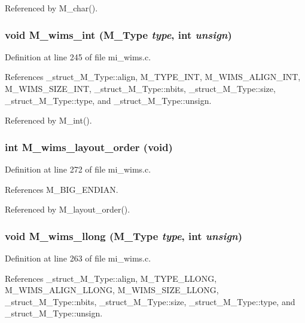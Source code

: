 Referenced by M\_\-char().
\subsubsection{\setlength{\rightskip}{0pt plus 5cm}void M\_\-wims\_\-int (\bf{M\_\-Type} {\em type}, int {\em unsign})}\label{mi__wims_8c_ee6a0cec79c141565391d7f53e9719ab}




Definition at line 245 of file mi\_\-wims.c.

References \_\-struct\_\-M\_\-Type::align, M\_\-TYPE\_\-INT, M\_\-WIMS\_\-ALIGN\_\-INT, M\_\-WIMS\_\-SIZE\_\-INT, \_\-struct\_\-M\_\-Type::nbits, \_\-struct\_\-M\_\-Type::size, \_\-struct\_\-M\_\-Type::type, and \_\-struct\_\-M\_\-Type::unsign.

Referenced by M\_\-int().
\subsubsection{\setlength{\rightskip}{0pt plus 5cm}int M\_\-wims\_\-layout\_\-order (void)}\label{mi__wims_8c_f5d4960a79cf363b1bb7cf42e943db3e}




Definition at line 272 of file mi\_\-wims.c.

References M\_\-BIG\_\-ENDIAN.

Referenced by M\_\-layout\_\-order().
\subsubsection{\setlength{\rightskip}{0pt plus 5cm}void M\_\-wims\_\-llong (\bf{M\_\-Type} {\em type}, int {\em unsign})}\label{mi__wims_8c_be4633981c044f2a53f6103feed664ee}




Definition at line 263 of file mi\_\-wims.c.

References \_\-struct\_\-M\_\-Type::align, M\_\-TYPE\_\-LLONG, M\_\-WIMS\_\-ALIGN\_\-LLONG, M\_\-WIMS\_\-SIZE\_\-LLONG, \_\-struct\_\-M\_\-Type::nbits, \_\-struct\_\-M\_\-Type::size, \_\-struct\_\-M\_\-Type::type, and \_\-struct\_\-M\_\-Type::unsign.

